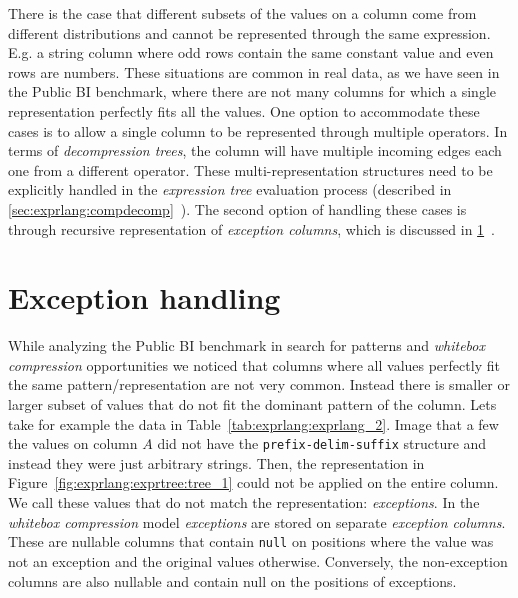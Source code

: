 There is the case that different subsets of the values on a column come from different distributions and cannot be represented through the same expression. E.g. a string column where odd rows contain the same constant value and even rows are numbers. These situations are common in real data, as we have seen in the Public BI benchmark, where there are not many columns for which a single representation perfectly fits all the values. One option to accommodate these cases is to allow a single column to be represented through multiple operators. In terms of \textit{decompression trees}, the column will have multiple incoming edges each one from a different operator. These multi-representation structures need to be explicitly handled in the \textit{expression tree} evaluation process (described in \ref{sec:exprlang:compdecomp}~). The second option of handling these cases is through recursive representation of \textit{exception columns}, which is discussed in \ref{sec:exprlang:exceptions}~.

\section{Exception handling}
\label{sec:exprlang:exceptions}

While analyzing the Public BI benchmark in search for patterns and \textit{whitebox compression} opportunities we noticed that columns where all values perfectly fit the same pattern/representation are not very common. Instead there is smaller or larger subset of values that do not fit the dominant pattern of the column. Lets take for example the data in Table~\ref{tab:exprlang:exprlang_2}. Image that a few the values on column \(A\) did not have the \verb|prefix-delim-suffix| structure and instead they were just arbitrary strings. Then, the representation in Figure~\ref{fig:exprlang:exprtree:tree_1} could not be applied on the entire column. We call these values that do not match the representation: \textit{exceptions}. In the \textit{whitebox compression} model \textit{exceptions} are stored on separate \textit{exception columns}. These are nullable columns that contain \verb|null| on positions where the value was not an exception and the original values otherwise. Conversely, the non-exception columns are also nullable and contain null on the positions of exceptions.

